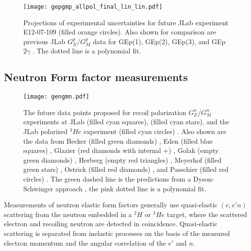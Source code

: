 \documentclass[epj]{svjour}
\begin{document}
\begin{figure}
 \hspace*{-2truecm}
 \texttt{[image: gepgmp\_allpol\_final\_lin\_lin.pdf]}
\caption{Projections of experimental uncertainties for future JLab experiment E12-07-109 \protect\cite{PR12-07-109} (filled orange circles). 
Also shown for comparison are previous JLab $G^p_E/G^p_M$ data for 
GEp(1), GEp(2), GEp(3), and GEp$2\gamma$ \cite{Jones:1999rz,Punjabi:2005wq,Gayou:2001qd,
Puckett:2011xg,Puckett:2010ac,Puckett:2017flj,Meziane:2010xc}. The dotted line is a polynomial fit. }
\label{fig:Gep} 
\end{figure}

 
\subsection{Neutron Form factor measurements}


\begin{figure}
\centering
\texttt{[image: gengmn.pdf]}
\caption{The future data points proposed for recoil polarization $G^n_{E}/G_M^n$ experiments at JLab \protect\cite{PR12-11-009} (filled cyan squares), \protect\cite{PR12-17-004} (filled cyan stars),  
and the JLab polarized $^3\!He$ experiment (filled cyan circles) \protect\cite{PR12-09-016}. 
Also shown are the 
data from Becker (filled green diamonds) \protect\cite{Becker:1999tw},
Eden (filled blue squares) \protect\cite{Eden:1994ji},
Glazier (red diamonds with internal +) \protect\cite{Glazier:2004ny},
Golak (empty green diamonds) \protect\cite{Golak:2000nt},
Herberg (empty red triangles) \protect\cite{Herberg:1999ud},
Meyerhof (filled green stars) \protect\cite{Meyerhoff:1994ev},
Ostrick (filled red diamonds) \protect\cite{Ostrick:1999xa}, and
Passchier (filled red circles) \protect\cite{Passchier:1999ju}.
The green dashed line is the predictions from  a Dyson-Schwinger approach  \cite{Roberts:1994dr}, the pink dotted line is a polynomial fit.  }
\label{fig:Gen} 
\end{figure}

Measurements of neutron elastic form factors generally use quasi-elastic 
$(e,e'n)$ scattering from the neutron embedded in a $^2\!H$
or $^3\!He $ target, where the scattered electron and recoiling
neutron are detected in coincidence. Quasi-elastic 
 scattering
is separated from inelastic processes on the basis of the measured
electron momentum and the angular correlation of the $e'$ and $n$.
\end{document}
